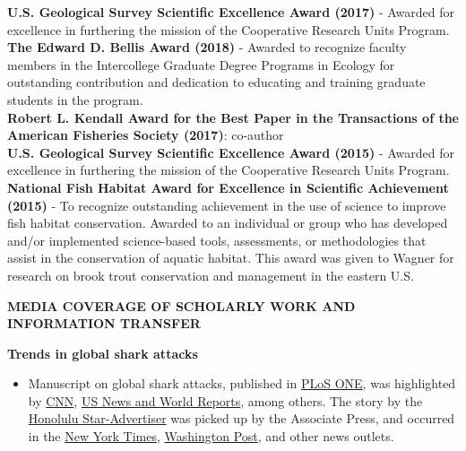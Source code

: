 \documentclass[10pt]{article}
\begin{document}
\begin{flushleft}
\vspace{5pt}
{\bf U.S. Geological Survey Scientific Excellence Award (2017)} - Awarded for excellence in furthering the mission of the Cooperative Research Units Program.\\
\vspace{5pt}
{\bf The Edward D. Bellis Award (2018)} - Awarded to recognize faculty members in the Intercollege Graduate Degree Programs in Ecology for outstanding contribution and dedication to educating and training graduate students in the program.\\
\vspace{5pt}
\textbf{Robert L. Kendall Award for the Best Paper in the Transactions of the American Fisheries Society (2017)}: co-author\\
\vspace{5pt}
{\bf U.S. Geological Survey Scientific Excellence Award (2015)} - Awarded for excellence in furthering the mission of the Cooperative Research Units Program.\\
\vspace{5pt}
{\bf National Fish Habitat Award for Excellence in Scientific Achievement  (2015)} - To recognize outstanding achievement in the use of science to improve fish habitat conservation. Awarded to an individual or group who has developed and/or implemented science-based tools, assessments, or methodologies that assist in the conservation of aquatic habitat. This award was given to Wagner for research on brook trout conservation and management in the eastern U.S.\\

\vspace{5pt}
\vspace{6pt}
\centerline {\bf{MEDIA COVERAGE OF SCHOLARLY WORK AND INFORMATION TRANSFER}}
\vspace{5pt}

\textbf{Trends in global shark attacks}\\
\begin{itemize}
	\item Manuscript on global shark attacks, published in \href{https://journals.plos.org/plosone/article?id=10.1371/journal.pone.0211049}{PLoS ONE}, was highlighted by \href{https://www.cnn.com/2019/02/27/health/shark-attack-risk-low-study/index.html}{CNN},  
	\href{https://www.usnews.com/news/health-news/articles/2019-02-27/dont-fear-shark-attacks-remain-rare
	}{US News and World Reports}, among others. The story by the 
  \href{https://www.staradvertiser.com/2019/03/01/hawaii-news/shark-attacks-up-but-risk-still-low/?HSA=02820a85be106052a2a700de45e8b4dd77e64a75}{Honolulu Star-Advertiser}
was picked up by the Associate Press, and occurred in the 
\href{https://www.nytimes.com/aponline/2019/03/02/us/ap-us-shark-bite-study.html}{New York Times}, \href{https://www.washingtonpost.com/national/health-science/study-more-sharks-bite-people-in-hawaii-but-risk-minuscule/2019/03/02/50c79b92-3d55-11e9-b10b-f05a22e75865_story.html?noredirect=on&utm_term=.2d98167dde7b}{Washington Post}, and other news outlets.
\end{itemize}


\end{flushleft}
\end{document}
